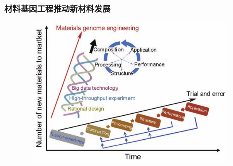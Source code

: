 \begin{frame}
	\frametitle{材料基因工程推动新材料发展}
\begin{figure}[h!]
\vspace*{-0.25in}
\centering
\includegraphics[height=2.90in,width=4.80in,viewport=0 0 1250 710,clip]{Figures/MGE_idea.png}
\label{MGE_idea}
\end{figure}
\end{frame}

